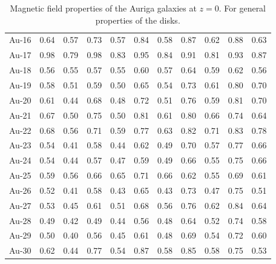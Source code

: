 \documentclass[usenatbib]{mnras}
\begin{document}
\begin{table}
\begin{tabular}{c c c c c c c c c c c}
Au-16 & 0.64 & 0.57 & 0.73 & 0.57 & 0.84 & 0.58 & 0.87 & 0.62 & 0.88 & 0.63\\
Au-17 & 0.98 & 0.79 & 0.98 & 0.83 & 0.95 & 0.84 & 0.91 & 0.81 & 0.93 & 0.87\\
Au-18 & 0.56 & 0.55 & 0.57 & 0.55 & 0.60 & 0.57 & 0.64 & 0.59 & 0.62 & 0.56\\
Au-19 & 0.58 & 0.51 & 0.59 & 0.50 & 0.65 & 0.54 & 0.73 & 0.61 & 0.80 & 0.70\\
Au-20 & 0.61 & 0.44 & 0.68 & 0.48 & 0.72 & 0.51 & 0.76 & 0.59 & 0.81 & 0.70\\
Au-21 & 0.67 & 0.50 & 0.75 & 0.50 & 0.81 & 0.61 & 0.80 & 0.66 & 0.74 & 0.64\\
Au-22 & 0.68 & 0.56 & 0.71 & 0.59 & 0.77 & 0.63 & 0.82 & 0.71 & 0.83 & 0.78\\
Au-23 & 0.54 & 0.41 & 0.58 & 0.44 & 0.62 & 0.49 & 0.70 & 0.57 & 0.77 & 0.66\\
Au-24 & 0.54 & 0.44 & 0.57 & 0.47 & 0.59 & 0.49 & 0.66 & 0.55 & 0.75 & 0.66\\
Au-25 & 0.59 & 0.56 & 0.66 & 0.65 & 0.71 & 0.66 & 0.62 & 0.55 & 0.69 & 0.61\\
Au-26 & 0.52 & 0.41 & 0.58 & 0.43 & 0.65 & 0.43 & 0.73 & 0.47 & 0.75 & 0.51\\
Au-27 & 0.53 & 0.45 & 0.61 & 0.51 & 0.68 & 0.56 & 0.76 & 0.62 & 0.84 & 0.64\\
Au-28 & 0.49 & 0.42 & 0.49 & 0.44 & 0.56 & 0.48 & 0.64 & 0.52 & 0.74 & 0.58\\
Au-29 & 0.50 & 0.40 & 0.56 & 0.45 & 0.61 & 0.48 & 0.69 & 0.54 & 0.72 & 0.60\\
Au-30 & 0.62 & 0.44 & 0.77 & 0.54 & 0.87 & 0.58 & 0.85 & 0.58 & 0.75 & 0.53\\
  \hline\hline
  \end{tabular}
  \label{table:DMO}
  \caption{Magnetic field properties of the Auriga galaxies at $z=0$. For general properties of the disks.}
\end{table}
\end{document}
